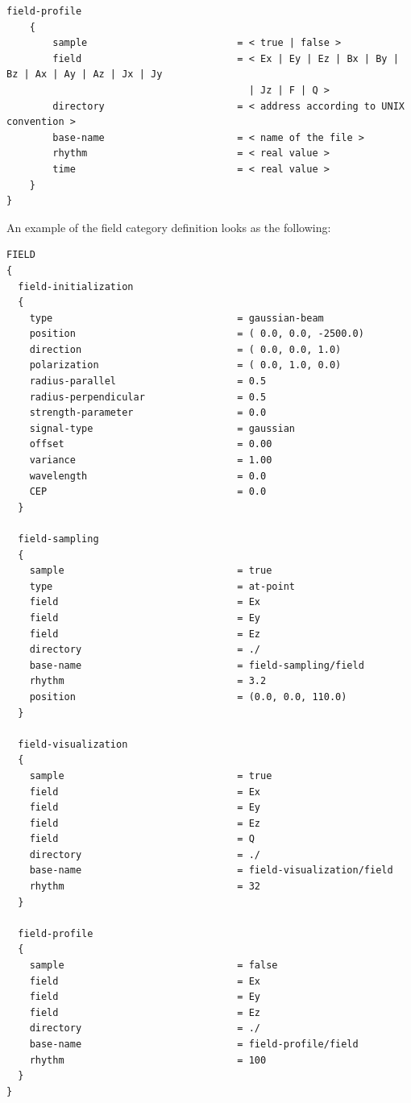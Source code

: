 \begin{Verbatim}[frame=single,fontsize=\small,tabsize=4]
	field-profile
	{
		sample                          = < true | false >
		field                           = < Ex | Ey | Ez | Bx | By | Bz | Ax | Ay | Az | Jx | Jy
                                          | Jz | F | Q >
		directory                       = < address according to UNIX convention >
		base-name                       = < name of the file >
		rhythm                          = < real value >
		time                            = < real value >
	}
}
\end{Verbatim}
%
An example of the field category definition looks as the following:
%
\begin{snugshade}
\begin{Verbatim}[fontsize=\small, tabsize = 4]
FIELD
{
  field-initialization
  {
    type                                = gaussian-beam
    position                            = ( 0.0, 0.0, -2500.0)
    direction                           = ( 0.0, 0.0, 1.0)
    polarization                        = ( 0.0, 1.0, 0.0)
    radius-parallel                     = 0.5
    radius-perpendicular                = 0.5
    strength-parameter                  = 0.0
    signal-type                         = gaussian
    offset                              = 0.00
    variance                            = 1.00
    wavelength                          = 0.0
    CEP                                 = 0.0
  }

  field-sampling
  {
    sample                              = true
    type                                = at-point
    field                               = Ex
    field                               = Ey
    field                               = Ez
    directory                           = ./
    base-name                           = field-sampling/field
    rhythm                              = 3.2
    position                            = (0.0, 0.0, 110.0)
  }

  field-visualization
  {
    sample                              = true
    field                               = Ex
    field                               = Ey
    field                               = Ez
    field                               = Q
    directory                           = ./
    base-name                           = field-visualization/field
    rhythm                              = 32
  }

  field-profile
  {
    sample                              = false
    field                               = Ex
    field                               = Ey
    field                               = Ez
    directory                           = ./
    base-name                           = field-profile/field
    rhythm                              = 100
  }
}
\end{Verbatim}
\end{snugshade}


